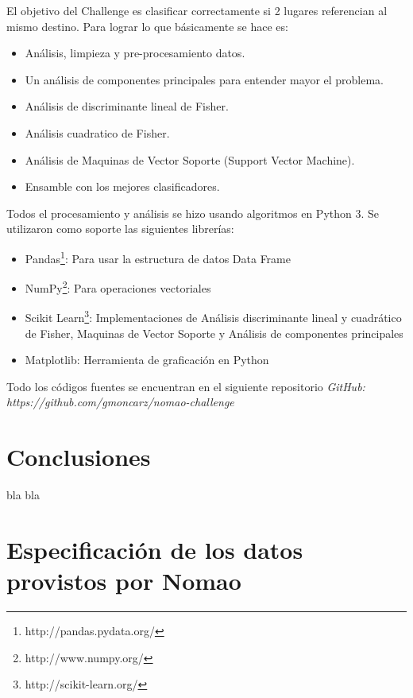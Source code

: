 \documentclass[journal]{IEEEtran}
\begin{document}
El objetivo del Challenge es clasificar correctamente si 2 lugares
referencian al mismo destino. Para lograr lo que básicamente se hace es:
\begin{itemize}
\item Análisis, limpieza y pre-procesamiento datos. 
\item Un análisis de componentes principales para entender mayor el problema. 
\item Análisis de discriminante lineal de Fisher.
\item Análisis cuadratico de Fisher.
\item Análisis de Maquinas de Vector Soporte (Support Vector Machine).
\item Ensamble con los mejores clasificadores.
\end{itemize}

Todos el procesamiento y análisis se hizo usando algoritmos en Python 3. Se
utilizaron como soporte las siguientes librerías:
\begin{itemize}
\item Pandas\footnote{http://pandas.pydata.org/}: Para usar la estructura de datos Data Frame
\item NumPy\footnote{http://www.numpy.org/}: Para operaciones vectoriales
\item Scikit Learn\footnote{http://scikit-learn.org/}: Implementaciones de Análisis discriminante lineal
	y cuadrático de Fisher, Maquinas de Vector Soporte y Análisis
	de componentes principales
\item Matplotlib: Herramienta de graficación en Python
\end{itemize}

Todo los códigos fuentes se encuentran en el siguiente repositorio
\textit{GitHub: https://github.com/gmoncarz/nomao-challenge}




\section{Conclusiones}

bla bla



\appendices

\section{Especificación de los datos provistos por Nomao}
\label{appendix1}
\end{document}
